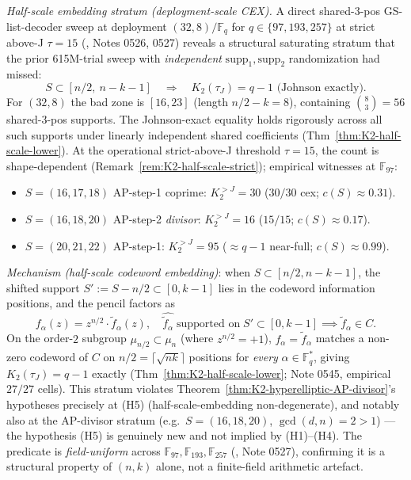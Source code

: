 \documentclass[11pt]{article}
\theoremstyle{definition}
\theoremstyle{remark}
\newcommand{\FF}{\mathbb{F}}
\begin{document}
\emph{Half-scale embedding stratum (deployment-scale CEX).}
A direct shared-3-pos GS-list-decoder sweep at deployment
$(32, 8)/\FF_{q}$ for $q \in \{97, 193, 257\}$ at strict above-J
$\tau = 15$ (\cite{CompanionRepo}, Notes 0526, 0527) reveals a
structural saturating stratum that the prior 615M-trial sweep with
\emph{independent} $\mathrm{supp}_1, \mathrm{supp}_2$ randomization had missed:
$$
\boxed{\quad S \subset [n/2,\ n - k - 1] \quad \Longrightarrow \quad K_2(\tau_J) = q - 1
\text{ (Johnson exactly).}\quad}
$$
For $(32, 8)$ the bad zone is $[16, 23]$ (length $n/2 - k = 8$), containing
$\binom{8}{3} = 56$ shared-3-pos supports. The Johnson-exact equality
holds rigorously across all such supports under linearly independent
shared coefficients (Thm~\ref{thm:K2-half-scale-lower}). At the operational
strict-above-J threshold $\tau = 15$, the count is shape-dependent
(Remark~\ref{rem:K2-half-scale-strict}); empirical witnesses at $\FF_{97}$:
\begin{itemize}
\item $S = (16, 17, 18)$ AP-step-1 coprime: $K_2^{>J} = 30$ ($30/30$ cex; $c(S) \approx 0.31$).
\item $S = (16, 18, 20)$ AP-step-2 \emph{divisor}: $K_2^{>J} = 16$ ($15/15$; $c(S) \approx 0.17$).
\item $S = (20, 21, 22)$ AP-step-1: $K_2^{>J} = 95$ ($\approx q-1$ near-full; $c(S) \approx 0.99$).
\end{itemize}
\emph{Mechanism (half-scale codeword embedding)}: when $S \subset [n/2, n-k-1]$,
the shifted support $S' := S - n/2 \subset [0, k-1]$ lies in the
codeword information positions, and the pencil factors as
$$f_\alpha(z) = z^{n/2} \cdot \widetilde f_\alpha(z), \quad \widehat{\widetilde f_\alpha}\;\text{supported on}\;S' \subset [0, k-1] \implies \widetilde f_\alpha \in C.$$
On the order-$2$ subgroup $\mu_{n/2} \subset \mu_n$ (where
$z^{n/2} = +1$), $f_\alpha = \widetilde f_\alpha$ matches a non-zero
codeword of $C$ on $n/2 = \lceil\sqrt{nk}\rceil$ positions for
\emph{every} $\alpha \in \FF_q^*$, giving $K_2(\tau_J) = q - 1$ exactly
(Thm~\ref{thm:K2-half-scale-lower}; \cite{CompanionRepo} Note 0545,
empirical $27/27$ cells).
This stratum violates Theorem~\ref{thm:K2-hyperelliptic-AP-divisor}'s
hypotheses precisely at (H5) (half-scale-embedding non-degenerate),
and notably also at the AP-divisor stratum (e.g.\ $S = (16, 18, 20)$,
$\gcd(d, n) = 2 > 1$) — the hypothesis (H5) is genuinely new and not
implied by (H1)--(H4).
The predicate is \emph{field-uniform} across $\FF_{97}, \FF_{193},
\FF_{257}$ (\cite{CompanionRepo}, Note 0527), confirming it is a
structural property of $(n, k)$ alone, not a finite-field arithmetic
artefact.
\end{document}
